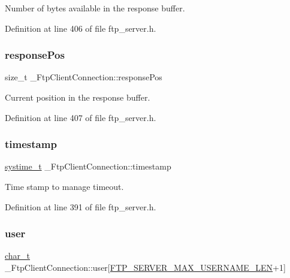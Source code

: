 Number of bytes available in the response buffer. 



Definition at line 406 of file ftp\+\_\+server.\+h.

\mbox{\label{struct__FtpClientConnection_ab3bfa0b68d6d1e8e66f34abb71d0771e}} 
\subsubsection{\texorpdfstring{response\+Pos}{responsePos}}
{\footnotesize\ttfamily size\+\_\+t \+\_\+\+Ftp\+Client\+Connection\+::response\+Pos}



Current position in the response buffer. 



Definition at line 407 of file ftp\+\_\+server.\+h.

\mbox{\label{struct__FtpClientConnection_aa023c74e606fdfae6eca5f5e10f3e362}} 
\subsubsection{\texorpdfstring{timestamp}{timestamp}}
{\footnotesize\ttfamily \hyperlink{compiler__port_8h_ae3e32a98d431a02106616da3071832dd}{systime\+\_\+t} \+\_\+\+Ftp\+Client\+Connection\+::timestamp}



Time stamp to manage timeout. 



Definition at line 391 of file ftp\+\_\+server.\+h.

\mbox{\label{struct__FtpClientConnection_a6dbbd01eeb99077fe4441cd64620c696}} 
\subsubsection{\texorpdfstring{user}{user}}
{\footnotesize\ttfamily \hyperlink{compiler__port_8h_a40bb5262bf908c328fbcfbe5d29d0201}{char\+\_\+t} \+\_\+\+Ftp\+Client\+Connection\+::user\mbox{[}\hyperlink{ftp__server_8h_a214093e595eff13cf5dde31875678cb4}{F\+T\+P\+\_\+\+S\+E\+R\+V\+E\+R\+\_\+\+M\+A\+X\+\_\+\+U\+S\+E\+R\+N\+A\+M\+E\+\_\+\+L\+EN}+1\mbox{]}}



